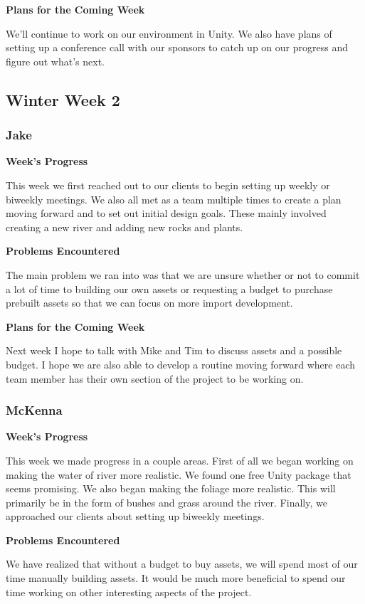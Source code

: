 \documentclass[10pt,journal,compsoc,onecolumn, draftclsnofoot]{IEEEtran}
\begin{document}
\noindent \textbf{Plans for the Coming Week}

We'll continue to work on our environment in Unity. We also have plans of setting up a conference call with our sponsors to catch up on our progress and figure out what's next.

\subsection{Winter Week 2}
\subsubsection{Jake}
\noindent \textbf{Week's Progress}

This week we first reached out to our clients to begin setting up weekly or biweekly meetings. We also all met as a team multiple times to create a plan moving forward and to set out initial design goals. These mainly involved creating a new river and adding new rocks and plants.

\noindent \textbf{Problems Encountered}

The main problem we ran into was that we are unsure whether or not to commit a lot of time to building our own assets or requesting a budget to purchase prebuilt assets so that we can focus on more import development.

\noindent \textbf{Plans for the Coming Week}

Next week I hope to talk with Mike and Tim to discuss assets and a possible budget. I hope we are also able to develop a routine moving forward where each team member has their own section of the project to be working on.

\subsubsection{McKenna}
\noindent \textbf{Week's Progress}

This week we made progress in a couple areas. First of all we began working on making the water of river more realistic. We found one free Unity package that seems promising. We also began making the foliage more realistic. This will primarily be in the form of bushes and grass around the river. Finally, we approached our clients about setting up biweekly meetings.

\noindent \textbf{Problems Encountered}

We have realized that without a budget to buy assets, we will spend most of our time manually building assets. It would be much more beneficial to spend our time working on other interesting aspects of the project.
\end{document}
